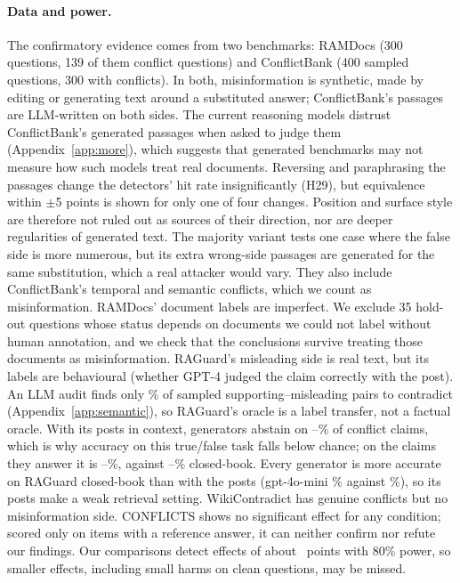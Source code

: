 \paragraph{Data and power.} The confirmatory evidence comes from two benchmarks: RAMDocs (300 questions, 139 of them
conflict questions) and ConflictBank (400 sampled questions, 300 with conflicts). In both, misinformation is
synthetic, made by editing or generating text around a substituted answer; ConflictBank's passages are LLM-written
on both sides. The current reasoning models distrust ConflictBank's generated passages when asked to judge them
(Appendix~\ref{app:more}), which suggests that generated benchmarks may not measure how such models treat real
documents. Reversing and paraphrasing the passages change the detectors' hit rate insignificantly (H29), but
equivalence within $\pm$5 points is shown for only one of four changes. Position and surface style are therefore not
ruled out as sources of their direction, nor are deeper regularities of generated text. The majority variant tests one
case where the false side is more numerous, but its extra wrong-side passages are generated for the same substitution,
which a real attacker would vary. They also include ConflictBank's temporal and semantic conflicts, which we count as
misinformation. RAMDocs' document labels are imperfect. We exclude 35 hold-out questions whose status depends on
documents we could not label without human annotation, and we check that the conclusions survive treating those
documents as misinformation. RAGuard's misleading side is real text, but its labels are behavioural (whether GPT-4
judged the claim correctly with the post). An LLM audit finds only \rgAudContradict\% of sampled supporting--misleading
pairs to contradict (Appendix~\ref{app:semantic}), so RAGuard's oracle is a label transfer, not a factual oracle. With
its posts in context, generators abstain on \rgAbstMin--\rgAbstMax\% of conflict claims, which is why accuracy on this
true/false task falls below chance; on the claims they answer it is \rgAnsMin--\rgAnsMax\%, against
\rgCbMin--\rgCbMax\% closed-book. Every generator is more accurate on RAGuard closed-book than with the posts
(gpt-4o-mini \zcRgMiniConflict\% against \zpRgMiniConflict\%), so its posts make a weak retrieval setting.
WikiContradict has genuine conflicts but no misinformation side. CONFLICTS shows no significant effect for any
condition; scored only on items with a reference answer, it can neither confirm nor refute our findings. Our
comparisons detect effects of about \mdeMed\ points with 80\% power, so smaller effects, including small harms on clean
questions, may be missed.

